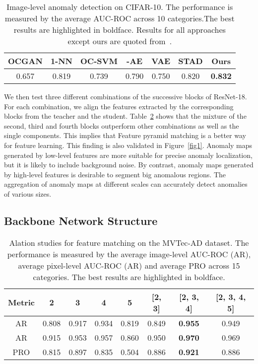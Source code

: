 \documentclass[final]{cvpr}
\begin{document}
{\begin{table}[!t]
	\centering
	\caption{Image-level anomaly detection on CIFAR-10. The performance is measured by the average AUC-ROC across 10 categories.The best results are highlighted in boldface. Results for all approaches except ours are quoted from~\cite{Bergmann2020}.}
	\label{tab5}
	\vspace{0.5em}
	\begin{adjustbox}{width=0.48\textwidth}
		\begin{tabular}{c c c c c c c}
			\hline
			OCGAN & 1-NN   & OC-SVM & -AE & VAE    & STAD & Ours \\ \hline
			0.657 & 0.819  & 0.739  & 0.790  & 0.750  & 0.820  & \textbf{0.832}\\
			\hline
		\end{tabular}
	\end{adjustbox}
\end{table}

We then test three different combinations of the successive blocks of ResNet-18. For each combination, we align the features extracted by the corresponding blocks from the teacher and the student. Table~\ref{tab6} shows that the mixture of the second, third and fourth blocks outperform other combinations as well as the single components. This implies that Feature pyramid matching is a better way for feature learning. This finding is also validated in Figure~\ref{fig1}. Anomaly maps generated by low-level features are more suitable for precise anomaly localization, but it is likely to include background noise. By contrast, anomaly maps generated by high-level features is desirable to segment big anomalous regions. The aggregation of anomaly maps at different scales can accurately detect anomalies of various sizes.



\subsection{Backbone Network Structure}
\label{sec5-sub2}

\begin{table}[!]
	\centering
	\caption{Alation studies for feature matching on the MVTec-AD dataset. The performance is measured by the average image-level AUC-ROC (AR), average pixel-level AUC-ROC (AR) and average PRO across 15 categories. The best results are highlighted in boldface. }
	\label{tab6}
	\vspace{0.5em}
	\begin{adjustbox}{width=0.48\textwidth}
		\begin{tabular}{c|ccccccc}
			\hline
			Metric & 2 & 3 & 4 & 5 & [2, 3] & [2, 3, 4] & [2, 3, 4, 5]\\
			\hline
			AR & 0.808 & 0.917 & 0.934 & 0.819 & 0.849 & \textbf{0.955} & 0.949\\
			AR & 0.915 & 0.953 & 0.957 & 0.860 & 0.950 & \textbf{0.970} &  0.969\\
			PRO & 0.815 & 0.897 & 0.835 & 0.504 & 0.886 & \textbf{0.921} & 0.886\\
			\hline
		\end{tabular}
	\end{adjustbox}
\end{table}

}
\end{document}
